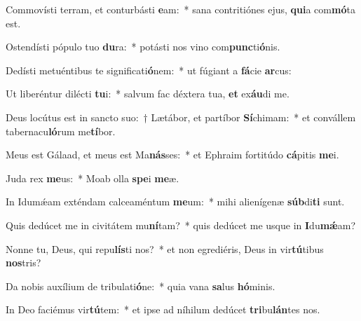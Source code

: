 \item Commovísti terram, et conturbásti \textbf{e}am:~* sana contritiónes ejus, \textbf{qui}a com\textbf{mó}ta est.
\item Ostendísti pópulo tuo \textbf{du}ra:~* potásti nos vino com\textbf{punc}ti\textbf{ó}nis.
\item Dedísti metuéntibus te significati\textbf{ó}nem:~* ut fúgiant a \textbf{fá}cie \textbf{ar}cus:
\item Ut liberéntur dilécti \textbf{tu}i:~* salvum fac déxtera tua, \textbf{et} ex\textbf{áu}di me.
\item Deus locútus est in sancto suo:~† Lætábor, et partíbor \textbf{Sí}chimam:~* et convállem tabernacu\textbf{ló}rum me\textbf{tí}bor.
\item Meus est Gálaad, et meus est Ma\textbf{nás}ses:~* et Ephraim fortitúdo \textbf{cá}pitis \textbf{me}i.
\item Juda rex \textbf{me}us:~* Moab olla \textbf{spe}i \textbf{me}æ.
\item In Idumǽam exténdam calceaméntum \textbf{me}um:~* mihi alienígenæ \textbf{súb}di\textbf{ti} sunt.
\item Quis dedúcet me in civitátem mu\textbf{ní}tam?~* quis dedúcet me usque in \textbf{I}du\textbf{mǽ}am?
\item Nonne tu, Deus, qui repu\textbf{lís}ti nos?~* et non egrediéris, Deus in vir\textbf{tú}tibus \textbf{nos}tris?
\item Da nobis auxílium de tribulati\textbf{ó}ne:~* quia vana \textbf{sa}lus \textbf{hó}minis.
\item In Deo faciémus vir\textbf{tú}tem:~* et ipse ad níhilum dedúcet \textbf{tri}bu\textbf{lán}tes nos.
